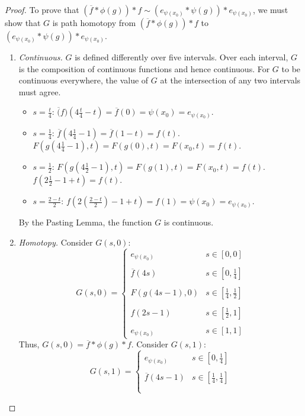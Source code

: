 \documentclass[11pt,reqno]{article}
\theoremstyle{definition}
\begin{document}
\begin{proof}
To prove that $\left(\overline{f}*\phi(g)\right)*f\sim \left( e_{\psi(x_0)}*\psi(g)\right)*e_{\psi(x_0)}$, we must show that $G$ is path homotopy from $\left(\overline{f}*\phi(g)\right)*f$ to $\left( e_{\psi(x_0)}*\psi(g)\right)*e_{\psi(x_0)}$.
\begin{enumerate}
\item \textit{Continuous.} $G$ is defined differently over five intervals. Over each interval, $G$ is the composition of continuous functions and hence continuous. For $G$ to be continuous everywhere,  the value of $G$ at the intersection of any two intervals must agree.
\begin{itemize}
\item $s=\frac{t}{4}$: $\overline(f)(4\frac{t}{4}-t)=\overline{f}(0)=\psi(x_0) = e_{\psi(x_0)}$.
\item $s=\frac{1}{4}$: $\overline{f}(4\frac{1}{4}-1)=\overline{f}(1-t)=f(t)$. \\
$F(g(4\frac{1}{4}-1),t)= F(g(0),t)=F(x_0,t)=f(t).$ 
\item  $s=\frac{1}{2}$:  $F(g(4\frac{1}{2}-1),t)= F(g(1),t)=F(x_0,t)=f(t).$\\
$f(2\frac{1}{2}-1+t)=f(t)$. 
\item $s=\frac{2-t}{2}$: $f(2\left(\frac{2-t}{2}\right)-1 +t) = f(1)=\psi(x_0)=e_{\psi(x_0)}$. 
\end{itemize}
By the Pasting Lemma, the function $G$ is continuous.
\item \textit{Homotopy.} Consider $G(s,0)$:
$$
G(s,0)=
\left\{
\begin{array}{ll}
e_{\psi(x_0)} &s\in\left[0,0\right]\\ \\
\overline{f}(4s) &s\in\left[0,\frac{1}{4}\right]\\ \\
F(g(4s-1),0) &s\in\left[\frac{1}{4},\frac{1}{2}\right]\\ \\
f(2s-1) &s\in\left[\frac{1}{2},1\right]\\ \\
e_{\psi(x_0)} &s\in\left[1,1\right]
\end{array}
\right.
$$
Thus, $G(s,0)=\overline{f}*\phi(g)*f$. Consider $G(s,1)$:
$$
G(s,1)=
\left\{
\begin{array}{ll}
e_{\psi(x_0)} &s\in\left[0,\frac{1}{4}\right]\\ \\
\overline{f}(4s-1) &s\in\left[\frac{1}{4},\frac{1}{4}\right]\\ \\

\end{array}$$
\end{enumerate}
\end{proof}
\end{document}
